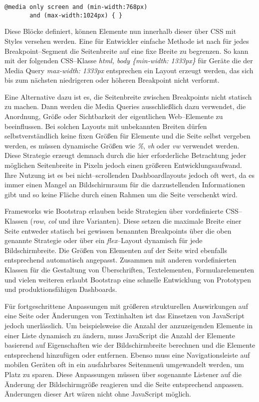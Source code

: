 \begin{verbatim}
@media only screen and (min-width:768px)
       and (max-width:1024px) { }
\end{verbatim}

Diese Blöcke definiert, können Elemente nun innerhalb dieser über \ac{CSS} mit Styles versehen werden.
Eine für Entwickler einfache Methode ist nach \autocite{JiangResponsiveWebDesignModeAndApplication.2014} für jedes Breakpoint--Segment die Seitenbreite auf eine fixe Breite zu begrenzen.
So kann mit der folgenden \acs{CSS}--Klasse \emph{html, body \{min-width: 1333px\}} für Geräte die der Media Query \emph{max-width: 1333px} entsprechen ein Layout erzeugt werden, das sich bis zum nächsten niedrigeren oder höheren Breakpoint nicht verformt.

Eine Alternative dazu ist es, die Seitenbreite zwischen Breakpoints nicht statisch zu machen.
Dann werden die Media Queries ausschließlich dazu verwendet, die Anordnung, Größe oder Sichtbarkeit der eigentlichen Web--Elemente zu beeinflussen.
\autocite[S. 33]{Laati.ImplementingResponsiveDesignInIndustrialDashboardEditor.2017} Bei solchen Layouts mit unbekannten Breiten dürfen selbstverständlich keine fixen Größen für Elemente und die Seite selbst vergeben werden, es müssen dynamische Größen wie \emph{\%}, \emph{vh} oder \emph{vw} verwendet werden.
Diese Strategie erzeugt demnach durch die hier erforderliche Betrachtung jeder möglichen Seitenbreite in Pixeln jedoch einen größeren Entwicklungsaufwand.
Ihre Nutzung ist es bei nicht--scrollenden Dashboardlayouts jedoch oft wert, da es immer einen Mangel an Bildschirmraum für die darzustellenden Informationen gibt und so keine Fläche durch einen Rahmen um die Seite verschenkt wird.

Frameworks wie Bootstrap \autocite{Bootstrap.BuildResponsiveSites.2024} erlauben beide Strategien über vordefinierte \acs{CSS}--Klassen (\emph{row}, \emph{col} und ihre Varianten).
Diese setzen die maximale Breite einer Seite entweder statisch bei gewissen benannten Breakpoints über die oben genannte Strategie oder über ein \emph{flex}--Layout dynamisch für jede Bildschirmbreite.
Die Größen von Elementen auf der Seite wird ebenfalls entsprechend automatisch angepasst.
Zusammen mit anderen vordefinierten Klassen für die Gestaltung von Überschriften, Textelementen, Formularelementen und vielen weiteren erlaubt Bootstrap eine schnelle Entwicklung von Prototypen und produktionsfähigen Dashboards.

\autocite[S. 72]{Harmsen.2018} Für fortgeschrittene Anpassungen mit größeren strukturellen Auswirkungen auf eine Seite oder Änderungen von Textinhalten ist das Einsetzen von JavaScript jedoch unerlässlich.
Um beispielsweise die Anzahl der anzuzeigenden Elemente in einer Liste dynamisch zu ändern, muss JavaScript die Anzahl der Elemente basierend auf Eigenschaften wie der Bildschirmbreite berechnen und die Elemente entsprechend hinzufügen oder entfernen.
Ebenso muss eine Navigationsleiste auf mobilen Geräten oft in ein ausfahrbares Seitenmenü umgewandelt werden, um Platz zu sparen.
Diese Anpassungen müssen über sogenannte Listener auf die Änderung der Bildschirmgröße reagieren und die Seite entsprechend anpassen.
Änderungen dieser Art wären nicht ohne JavaScript möglich.
